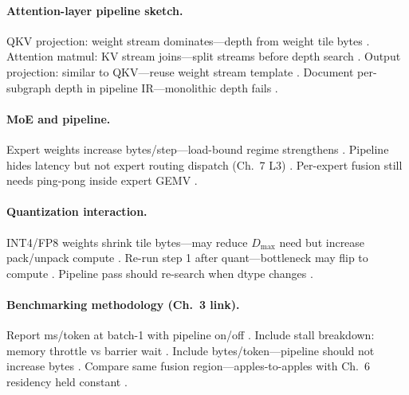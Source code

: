 \paragraph{Attention-layer pipeline sketch.}
QKV projection: weight stream dominates---depth from weight tile bytes \citep{taxbreak2026,shah2024flashattention3}.
Attention matmul: KV stream joins---split streams before depth search \citep{kwon2023vllm,dao2023flashdecoding,dao2022flashattention}.
Output projection: similar to QKV---reuse weight stream template \citep{yirage2026,patel2025llminference}.
Document per-subgraph depth in pipeline IR---monolithic depth fails \citep{chen2020compilerbasedhardw,wu2024mirage}.

\paragraph{MoE and pipeline.}
Expert weights increase bytes/step---load-bound regime strengthens \citep{taxbreak2026,liu2024deepseekv3}.
Pipeline hides latency but not expert routing dispatch (Ch.~7 L3) \citep{mpk2025,wu2024mirage,patel2025llminference}.
Per-expert fusion still needs ping-pong inside expert GEMV \citep{yirage2026,memoryfloor2026,shah2024flashattention3}.

\paragraph{Quantization interaction.}
INT4/FP8 weights shrink tile bytes---may reduce $D_{\max}$ need but increase pack/unpack compute \citep{taxbreak2026,patel2025llminference}.
Re-run step 1 after quant---bottleneck may flip to compute \citep{shah2024flashattention3,yirage2026,memoryfloor2026}.
Pipeline pass should re-search when dtype changes \citep{wu2024mirage,chen2020compilerbasedhardw}.

\paragraph{Benchmarking methodology (Ch.~3 link).}
Report ms/token at batch-1 with pipeline on/off \citep{patel2025llminference,kwon2023vllm}.
Include stall breakdown: memory throttle vs barrier wait \citep{memoryfloor2026,shah2024flashattention3}.
Include bytes/token---pipeline should not increase bytes \citep{taxbreak2026,dao2022flashattention}.
Compare same fusion region---apples-to-apples with Ch.~6 residency held constant \citep{yirage2026,chen2020compilerbasedhardw}.

